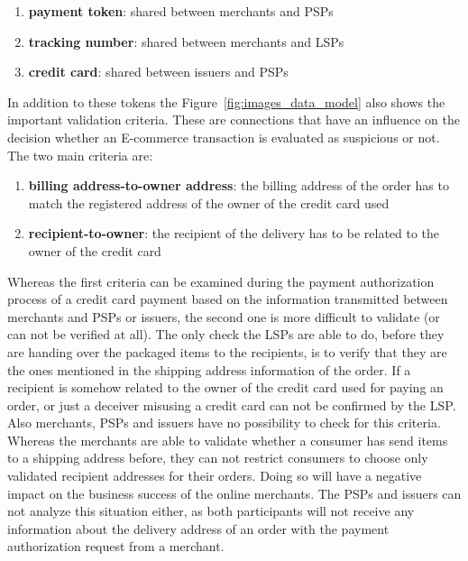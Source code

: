 \begin{enumerate}
  \item \textbf{payment token}: shared between merchants and \gls{PSP}s
  \item \textbf{tracking number}: shared between merchants and \gls{LSP}s
  \item \textbf{credit card}: shared between issuers and \gls{PSP}s
\end{enumerate}

In addition to these tokens the Figure~\ref{fig:images_data_model} also shows the important validation criteria. These are connections that have an influence on the decision whether an \gls{E-commerce} transaction is evaluated as suspicious or not. The two main criteria are: \@

\begin{enumerate}
  \item \textbf{billing address-to-owner address}: the billing address of the order has to match the registered address of the owner of the credit card used
  \item \textbf{recipient-to-owner}: the recipient of the delivery has to be related to the owner of the credit card
\end{enumerate}


Whereas the first criteria can be examined during the payment authorization process of a credit card payment based on the information transmitted between merchants and \gls{PSP}s or issuers, the second one is more difficult to validate (or can not be verified at all). The only check the \gls{LSP}s are able to do, before they are handing over the packaged items to the recipients, is to verify that they are the ones mentioned in the shipping address information of the order. If a recipient is somehow related to the owner of the credit card used for paying an order, or just a deceiver misusing a credit card can not be confirmed by the \gls{LSP}. \\

Also merchants, \gls{PSP}s and issuers have no possibility to check for this criteria. Whereas the merchants are able to validate whether a consumer has send items to a shipping address before, they can not restrict consumers to choose only validated recipient addresses for their orders. Doing so will have a negative impact on the business success of the online merchants. The \gls{PSP}s and issuers can not analyze this situation either, as both participants will not receive any information about the delivery address of an order with the payment authorization request from a merchant. \\

